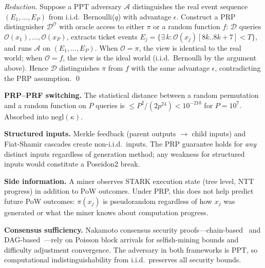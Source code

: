 \documentclass[11pt,a4paper]{article}
\begin{document}
\emph{Reduction.} Suppose a PPT adversary $\mathcal{A}$ distinguishes the real event sequence $(E_1, \ldots, E_P)$ from i.i.d.\ Bernoulli($q$) with advantage $\epsilon$. Construct a PRP distinguisher $\mathcal{D}^{\mathcal{O}}$ with oracle access to either $\pi$ or a random function $f$: $\mathcal{D}$ queries $\mathcal{O}(x_1), \ldots, \mathcal{O}(x_P)$, extracts ticket events $E_j = \{\exists\, k : \mathcal{O}(x_j)[8k..8k{+}7] < T\}$, and runs $\mathcal{A}$ on $(E_1, \ldots, E_P)$. When $\mathcal{O} = \pi$, the view is identical to the real world; when $\mathcal{O} = f$, the view is the ideal world (i.i.d.\ Bernoulli by the argument above). Hence $\mathcal{D}$ distinguishes $\pi$ from $f$ with the same advantage $\epsilon$, contradicting the PRP assumption. \qed

\textbf{PRP--PRF switching.} The statistical distance between a random permutation and a random function on $P$ queries is $\leq P^2/(2p^{24}) < 10^{-210}$ for $P = 10^7$. Absorbed into $\mathrm{negl}(\kappa)$.

\textbf{Structured inputs.} Merkle feedback (parent outputs $\to$ child inputs) and Fiat-Shamir cascades create non-i.i.d.\ inputs. The PRP guarantee holds for \emph{any} distinct inputs regardless of generation method; any weakness for structured inputs would constitute a Poseidon2 break.

\textbf{Side information.} A miner observes STARK execution state (tree level, NTT progress) in addition to PoW outcomes. Under PRP, this does not help predict future PoW outcomes: $\pi(x_j)$ is pseudorandom regardless of how $x_j$ was generated or what the miner knows about computation progress.

\textbf{Consensus sufficiency.} Nakamoto consensus security proofs---chain-based~\cite{nakamoto} and DAG-based~\cite{dagknight}---rely on Poisson block arrivals for selfish-mining bounds and difficulty adjustment convergence. The adversary in both frameworks is PPT, so computational indistinguishability from i.i.d.\ preserves all security bounds.
\end{document}
